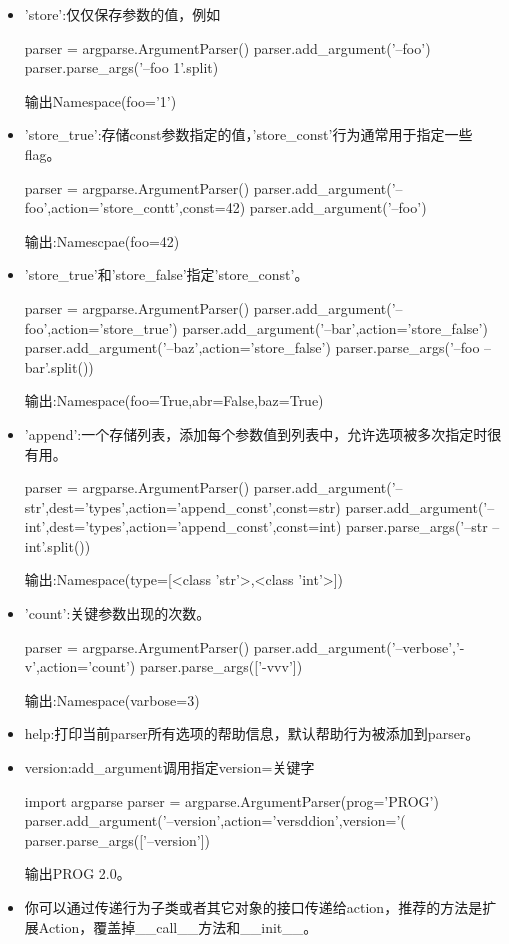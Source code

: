 \begin{itemize}
\item 'store':仅仅保存参数的值，例如
\begin{python}
parser = argparse.ArgumentParser()
parser.add_argument('--foo')
parser.parse_args('--foo 1'.split)
\end{python}
输出Namespace(foo='1')\par
\item 'store\_true':存储const参数指定的值，'store\_const'行为通常用于指定一些flag。
\begin{python}
parser = argparse.ArgumentParser()
parser.add_argument('--foo',action='store_contt',const=42)
parser.add_argument('--foo')
\end{python}
输出:Namescpae(foo=42)
\item 'store\_true'和'store\_false'指定'store\_const'。
\begin{python}
parser = argparse.ArgumentParser()
parser.add_argument('--foo',action='store_true')
parser.add_argument('--bar',action='store_false')
parser.add_argument('--baz',action='store_false')
parser.parse_args('--foo --bar'.split())
\end{python}
输出:Namespace(foo=True,abr=False,baz=True)
\item 'append':一个存储列表，添加每个参数值到列表中，允许选项被多次指定时很有用。
\begin{python}
parser = argparse.ArgumentParser()
parser.add_argument('--str',dest='types',action='append_const',const=str)
parser.add_argument('--int',dest='types',action='append_const',const=int)
parser.parse_args('--str --int'.split())
\end{python}
输出:Namespace(type=[<class 'str'>,<class 'int'>])
\item 'count':关键参数出现的次数。
\begin{python}
parser = argparse.ArgumentParser()
parser.add_argument('--verbose','-v',action='count')
parser.parse_args(['-vvv'])
\end{python}
输出:Namespace(varbose=3)
\item help:打印当前parser所有选项的帮助信息，默认帮助行为被添加到parser。
\item version:add\_argument调用指定version=关键字
\begin{python}
import argparse
parser = argparse.ArgumentParser(prog='PROG')
parser.add_argument('--version',action='versddion',version='(%
parser.parse_args(['--version'])
\end{python}
输出PROG 2.0。
\item 你可以通过传递行为子类或者其它对象的接口传递给action，推荐的方法是扩展Action，覆盖掉\_\_call\_\_方法和\_\_init\_\_。

\end{itemize}
